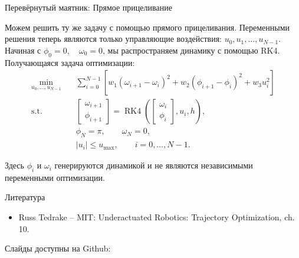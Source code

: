 \documentclass{beamer}
\newcommand{\myqrframe}{
	\begin{frame}
		\begin{center}
			\centerline{Слайды доступны на Github:}
			\bigskip
			\centerline{\mygit}
			\bigskip
			\myqr
		\end{center}
	\end{frame}
}
\begin{document}
	
	
	\begin{frame}{Перевёрнутый маятник: Прямое прицеливание}
		\begin{flushleft}
			Можем решить ту же задачу с помощью
			прямого прицеливания. Переменными решения теперь являются только управляющие воздействия: $		u_0,u_1,\ldots,u_{N-1}$. Начиная с $		\phi_0=0,
			\quad
			\omega_0=0$, 
			мы распространяем динамику с помощью RK4. Получающаяся задача оптимизации:
			\begin{align}
				\min_{u_0,\ldots,u_{N-1}}\quad
				&
				\sum_{i=0}^{N-1}
				\left[
				w_1(\omega_{i+1}-\omega_i)^2
				+
				w_2(\phi_{i+1}-\phi_i)^2
				+
				w_3u_i^2
				\right]
				\\[0.5em]
				\text{s.t.}\quad
				&
				\begin{bmatrix}
					\omega_{i+1}\\
					\phi_{i+1}
				\end{bmatrix}
				=
				\operatorname{RK4}
				\left(
				\begin{bmatrix}
					\omega_i\\
					\phi_i
				\end{bmatrix},
				u_i,h
				\right),
				\\
				&
				\phi_N=\pi,\qquad
				\omega_N=0,
				\\
				&
				|u_i|\leq u_{\max},
				\qquad i=0,\ldots,N-1.
			\end{align}
			
			
			Здесь $\phi_i$ и $\omega_i$ генерируются
			динамикой и не являются независимыми переменными оптимизации.
		\end{flushleft}
	\end{frame}



\begin{frame}{Литература}
	
	\begin{itemize}
		
		
		\item Russ Tedrake -- MIT:
		{Underactuated Robotics: Trajectory Optimization, ch. 10.}
		
	\end{itemize}
	
\end{frame}



\myqrframe
\end{document}
